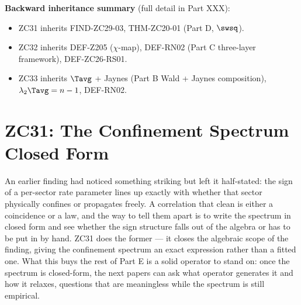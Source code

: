 \documentclass[12pt, a4paper]{article}
\begin{document}
\textbf{Backward inheritance summary} (full detail in Part XXX):
\begin{itemize}[noitemsep,leftmargin=1.5em]
  \item ZC31 inherits FIND-ZC29-03, THM-ZC20-01 (Part D, $\swsq$).
  \item ZC32 inherits DEF-Z205 ($\chi$-map), DEF-RN02 (Part C three-layer
    framework), DEF-ZC26-RS01.
  \item ZC33 inherits $\Tavg$ + Jaynes (Part B Wald + Jaynes
    composition), $\lambda_2\Tavg = n-1$, DEF-RN02.
\end{itemize}

\medskip

\section{ZC31: The Confinement Spectrum Closed Form}
\label{sec:zc31-confinement-spectrum}

An earlier finding had noticed something striking but left it half-stated: the
sign of a per-sector rate parameter lines up exactly with whether that sector
physically confines or propagates freely. A correlation that clean is either a
coincidence or a law, and the way to tell them apart is to write the spectrum in
closed form and see whether the sign structure falls out of the algebra or has to
be put in by hand. ZC31 does the former --- it closes the algebraic scope of the
finding, giving the confinement spectrum an exact expression rather than a
fitted one. What this buys the rest of Part E is a solid operator to stand on:
once the spectrum is closed-form, the next papers can ask what operator generates
it and how it relaxes, questions that are meaningless while the spectrum is still
empirical.
\end{document}
